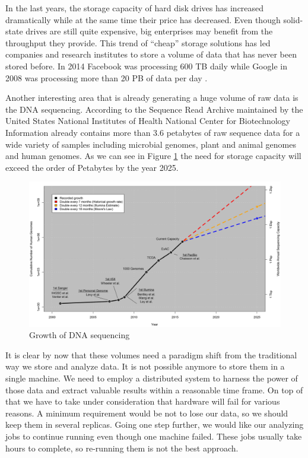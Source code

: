 In the last years, the storage capacity of hard disk drives has
increased dramatically while at the same time their price has
decreased. Even though solid-state drives are still quite expensive,
big enterprises may benefit from the throughput they provide. This
trend of ``cheap'' storage solutions has led companies and research
institutes to store a volume of data that has never been stored
before. In 2014 Facebook was processing 600 TB daily
\cite{facebook_data}
while Google in 2008 was processing more than 20 PB of data per day
\cite{Dean:2008:MSD:1327452.1327492}.


Another interesting area that is already generating a huge volume of
raw data is the DNA sequencing. According to \cite{10.1371/journal.pbio.1002195} the Sequence
Read Archive maintained by the United States National Institutes of Health
National Center for Biotechnology Information already contains more
than 3.6 petabytes of raw sequence data for a wide variety of samples
including microbial genomes, plant and animal genomes and human
genomes. As we can see in Figure \ref{fig:intro_genomics_growth} the
need for storage capacity will exceed the order of Petabytes by the
year 2025.

\begin{figure}
\centering
\includegraphics[scale=0.5]{resources/images/Introduction/genomics_growth.png}
\caption{Growth of DNA sequencing \cite{10.1371/journal.pbio.1002195}}
\label{fig:intro_genomics_growth}
\end{figure}

It is clear by now that these volumes need a paradigm shift
from the traditional way we store and analyze data. It is not possible
anymore to store them in a single machine. We need to employ a
distributed system to harness the power of those data and extract
valuable results within a reasonable time frame. On top of that we have
to take under consideration that hardware will fail for various
reasons. A minimum requirement would be not to lose our data, so we
should keep them in several replicas. Going one step further, we would
like our analyzing jobs to continue running even though one machine failed. These
jobs usually take hours to complete, so re-running them is not the
best approach.

